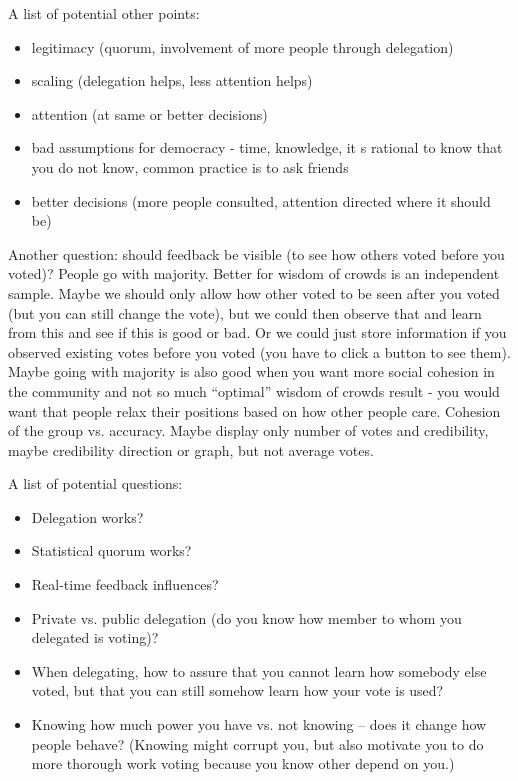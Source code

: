 \documentclass{sigchi}
\begin{document}
A list of potential other points:
\begin{itemize}
\item legitimacy (quorum, involvement of more people through delegation)
\item scaling (delegation helps, less attention helps)
\item attention (at same or better decisions)
\item bad assumptions for democracy - time, knowledge, it s rational to know that you do not know, common practice is to ask friends
\item better decisions (more people consulted, attention directed where it should be)
\end{itemize}

Another question: should feedback be visible (to see how others voted before you voted)?
People go with majority.
Better for wisdom of crowds is an independent sample.
Maybe we should only allow how other voted to be seen after you voted (but you can still change the vote),
but we could then observe that and learn from this and see if this is good or bad.
Or we could just store information if you observed existing votes before you voted (you have to click a button to see them).
Maybe going with majority is also good when you want more social cohesion in the community and not so much ``optimal''
wisdom of crowds result -  you would want that people relax their positions based on how other people care.
Cohesion of the group vs. accuracy.
Maybe display only number of votes and credibility, maybe credibility direction or graph, but not average votes.

A list of potential questions:
\begin{itemize}
\item Delegation works?
\item Statistical quorum works?
\item Real-time feedback influences?
\item Private vs. public delegation (do you know how member to whom you delegated is voting)?
\item When delegating, how to assure that you cannot learn how somebody else voted, but that you can still somehow
learn how your vote is used?
\item Knowing how much power you have vs. not knowing -- does it change how people behave? (Knowing might corrupt you,
but also motivate you to do more thorough work voting because you know other depend on you.)
\end{itemize}
\end{document}
